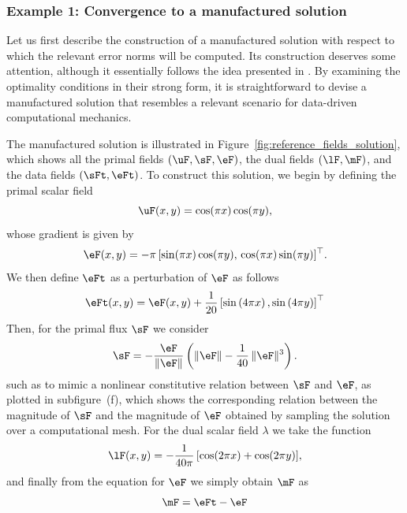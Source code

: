 \subsubsection{Example 1: Convergence to a manufactured solution}

Let us first describe the construction of a manufactured solution with respect to which the relevant error norms will be computed. Its construction deserves some attention, although it essentially follows the idea presented in \cite{Balbao2025}. By examining the optimality conditions in their strong form, it is straightforward to devise a manufactured solution that resembles a relevant scenario for data-driven computational mechanics.

The manufactured solution is illustrated in Figure~\ref{fig:reference_fields_solution}, which
shows all the primal fields $(\uF, \sF, \eF)$, the dual fields $(\lF,\mF)$, and the data fields
$(\sFt,\eFt)$. To construct this solution, we begin by defining the primal scalar field
\begin{equation}
 \uF(x,y) = \cos(\pi x)\cos(\pi y),
\end{equation}
whose gradient is given by
\begin{equation}
	\eF(x,y) = -\pi \,[\sin(\pi x)\cos(\pi y),\, \cos(\pi x)\sin(\pi y)]^{\top}.
\end{equation}
We then define $\eFt$ as a perturbation of $\eF$ as follows
\begin{equation}
\eFt(x,y) = \eF(x,y) + \frac{1}{20} \left[\sin\left(4\pi x \right), \sin\left(4 \pi y \right) \right]^{\top}
\end{equation}
Then, for the primal flux $\sF$ we consider 
\begin{equation}\label{eq:nonlinear_fluxlaw}
	\sF = -\frac{\eF}{\|\eF\|}\left(\|\eF\| - \frac{1}{40}\,\|\eF\|^{3}\right).
\end{equation}
such as to mimic a nonlinear constitutive relation between $\sF$ and $\eF$, as plotted in subfigure~(f), which shows the corresponding relation between the magnitude of $\sF$ and the magnitude of $\eF$ obtained by sampling the solution over a computational mesh.
For the dual scalar field $\lambda$ we take the function
\begin{equation}
	\lF(x,y) = -\frac{1}{40\pi}\,[\cos(2\pi x) + \cos(2\pi y)],
\end{equation}
and finally from the equation for $\eF$ we simply obtain $\mF$ as
\begin{equation}\label{eq:formu}
\mF = \eFt - \eF
\end{equation}
